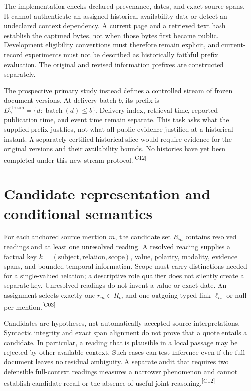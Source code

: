 \documentclass[10pt,letterpaper]{article}
\newcommand{\claim}[1]{\textsuperscript{\scriptsize[#1]}}
\begin{document}
The implementation checks declared provenance, dates, and exact source spans.
It cannot authenticate an assigned historical availability date or detect an
undeclared context dependency. A current page and a retrieved text hash establish
the captured bytes, not when those bytes first became public. Development
eligibility conventions must therefore remain explicit, and current-record
experiments must not be described as historically faithful prefix evaluation.
The original and revised information prefixes are constructed separately.

The prospective primary study instead defines a controlled stream of frozen
document versions. At delivery batch $b$, its prefix is
$D^{\mathrm{stream}}_b=\{d:\operatorname{batch}(d)\leq b\}$. Delivery index,
retrieval time, reported publication time, and event time remain separate.
This task asks what the supplied prefix justifies, not what all public evidence
justified at a historical instant. A separately certified historical slice
would require evidence for the original versions and their availability bounds.
No histories have yet been completed under this new stream protocol.\claim{C12}

\section{Candidate representation and conditional semantics}
\label{sec:representation}
For each anchored source mention $m$, the candidate set $R_m$ contains resolved
readings and at least one unresolved reading. A resolved reading supplies a
factual key $k=(\text{subject},\text{relation},\text{scope})$, value, polarity,
modality, evidence spans, and bounded temporal information. Scope must carry
distinctions needed for a single-valued relation; a descriptive role qualifier
does not silently create a separate key. Unresolved readings do not invent a
value or exact date. An assignment selects exactly one $r_m\in R_m$ and one
outgoing typed link $\ell_m$ or null per mention.\claim{C03}

Candidates are hypotheses, not automatically accepted source interpretations.
Syntactic integrity and exact span alignment do not prove that a quote entails
a candidate. In particular, a reading that is plausible in a local passage may
be rejected by other available context. Such cases can test inference even if
the full document leaves no residual ambiguity. A separate audit that requires
two defensible full-context readings measures a narrower phenomenon and cannot
establish candidate recall or the absence of useful joint reasoning.\claim{C12}
\end{document}
